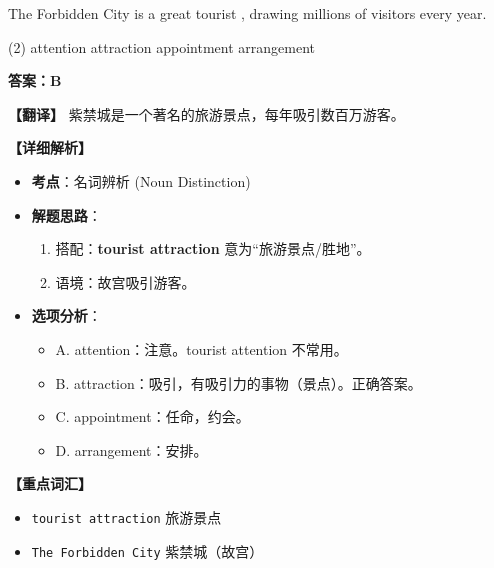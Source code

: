 \documentclass[11pt, a4paper]{article}
\newcommand{\analysis}[4]{
    \begin{solutionbox}
        \textbf{答案：#1}
        
        \textbf{【翻译】} #2
        
        \textbf{【详细解析】}
        #3
        
        \textbf{【重点词汇】}
        #4
    \end{solutionbox}
}
\newcommand{\blank}{\underline{\hspace{1.5cm}}}
\begin{document}
\begin{questions}
    \item The Forbidden City is a great tourist \blank, drawing millions of visitors every year.
    \begin{tasks}(2)
        \task attention \task attraction
        \task appointment \task arrangement
    \end{tasks}
    \analysis{B}{紫禁城是一个著名的旅游景点，每年吸引数百万游客。}{
        \begin{itemize}
            \item \textbf{考点}：名词辨析 (Noun Distinction)
            \item \textbf{解题思路}：
                \begin{enumerate}
                    \item 搭配：\textbf{tourist attraction} 意为“旅游景点/胜地”。
                    \item 语境：故宫吸引游客。
                \end{enumerate}
            \item \textbf{选项分析}：
                \begin{itemize}
                    \item A. attention：注意。tourist attention 不常用。
                    \item B. attraction：吸引，有吸引力的事物（景点）。正确答案。
                    \item C. appointment：任命，约会。
                    \item D. arrangement：安排。
                \end{itemize}
        \end{itemize}
    }{
        \begin{itemize}
            \item \texttt{tourist attraction} 旅游景点
            \item \texttt{The Forbidden City} 紫禁城（故宫）
        \end{itemize}
    }


\end{questions}
\end{document}
